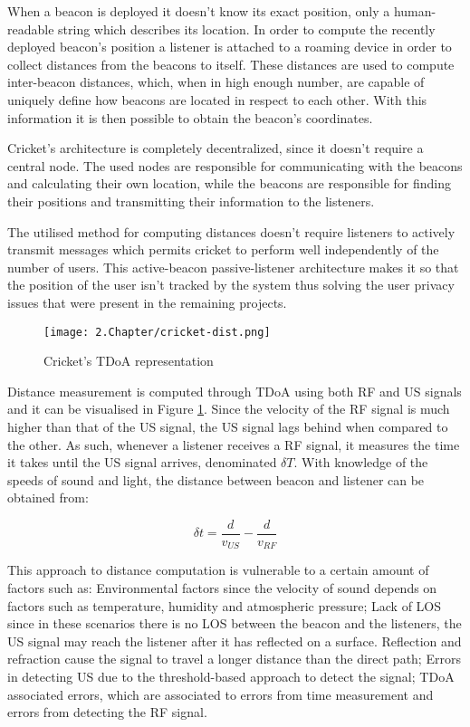  
When a beacon is deployed it doesn't know its exact position, only a human-readable string which describes its location. In order to compute the recently deployed beacon's position a listener is attached to a roaming device in order to collect distances from the beacons to itself. These distances are used to compute inter-beacon distances, which, when in high enough number, are capable of uniquely define how beacons are located in respect to each other. With this information it is then possible to obtain the beacon's coordinates.  
  
  
Cricket's architecture is completely decentralized, since it doesn't require a central node. The used nodes are responsible for communicating with the beacons and calculating their own location, while the beacons are responsible for finding their positions and transmitting their information to the listeners.  
  
  
The utilised method for computing distances doesn't require listeners to actively transmit messages which permits cricket to perform well independently of the number of users. This active-beacon passive-listener architecture makes it so that the position of the user isn't tracked by the system thus solving the user privacy issues that were present in the remaining projects.  
  
  
\begin{figure}[H]  
\centering  
\texttt{[image: 2.Chapter/cricket-dist.png]}  
\caption[Cricket's \ac{TDoA} representation]{Cricket's \ac{TDoA} representation}  
\label{fig:cricket-tdoa}  
\end{figure}  
  
  
Distance measurement is computed through \ac{TDoA} using both \ac{RF} and \ac{US} signals and it can be visualised in Figure \ref{fig:cricket-tdoa}. Since the velocity of the \ac{RF} signal is much higher than that of the \ac{US} signal, the \ac{US} signal lags behind when compared to the other. As such, whenever a listener receives a \ac{RF} signal, it measures the time it takes until the \ac{US} signal arrives, denominated $\delta{T}$. With knowledge of the speeds of sound and light, the distance between beacon and listener can be obtained from:  
  
  
\begin{equation}  
\delta t = \frac{d}{v_{US}} - \frac{d}{v_{RF}}  
\end{equation}  
  
  
This approach to distance computation is vulnerable to a certain amount of factors such as: Environmental factors since the velocity of sound depends on factors such as temperature, humidity and atmospheric pressure; Lack of \ac{LOS} since in these scenarios there is no \ac{LOS} between the beacon and the listeners, the \ac{US} signal may reach the listener after it has reflected on a surface. Reflection and refraction cause the signal to travel a longer distance than the direct path; Errors in detecting \ac{US} due to the threshold-based approach to detect the signal; \ac{TDoA} associated errors, which are associated to errors from time measurement and errors from detecting the \ac{RF} signal.  
  

